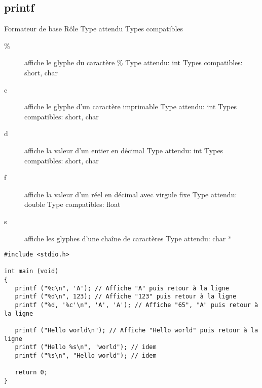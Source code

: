 \documentclass[a4paper]{article}
\begin{document}
\subsection{printf}
Formateur de base 	Rôle 	Type attendu 	Types compatibles
\begin{description}
  \item  [\%] 	affiche le glyphe du caractère \% 	Type attendu: int 	Types compatibles: short, char
  \item  [c]	affiche le glyphe d'un caractère imprimable 	Type attendu: int 	Types compatibles: short, char
  \item  [d]	affiche la valeur d'un entier en décimal 	Type attendu: int 	Types compatibles: short, char
  \item  [f]	affiche la valeur d'un réel en décimal avec virgule fixe 	Type attendu: double Type compatibles: float
  \item  [s]	affiche les glyphes d'une chaîne de caractères 	Type attendu: char *
\end{description}
\begin{lstlisting}
#include <stdio.h>

int main (void)
{
   printf ("%c\n", 'A'); // Affiche "A" puis retour à la ligne
   printf ("%d\n", 123); // Affiche "123" puis retour à la ligne
   printf ("%d, '%c'\n", 'A', 'A'); // Affiche "65", "A" puis retour à la ligne

   printf ("Hello world\n"); // Affiche "Hello world" puis retour à la ligne
   printf ("Hello %s\n", "world"); // idem
   printf ("%s\n", "Hello world"); // idem

   return 0;
}
\end{lstlisting}
\end{document}
